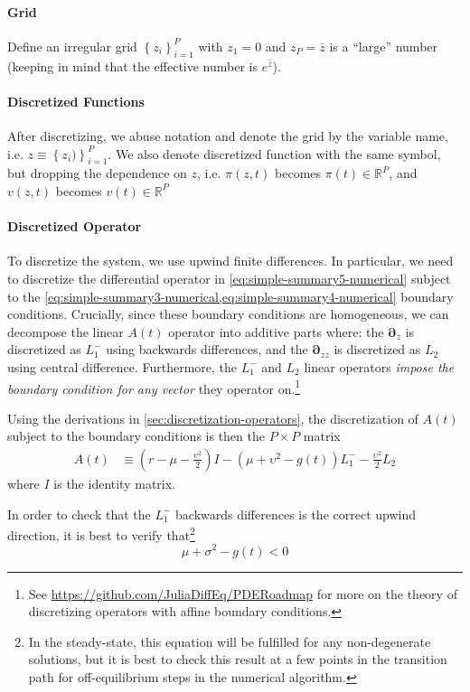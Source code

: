 \documentclass[11pt]{article}
\newcommand{\D}[1][]{\ensuremath{\boldsymbol{\partial}_{#1}}}
\newcommand{\R}{\ensuremath{\mathbb{R}}}
\newcommand{\set}[1]{\ensuremath{\left\{{#1}\right\}}}
\begin{document}
\paragraph{Grid}

Define an irregular grid $\set{z_i}_{i=1}^P$ with $z_1 = 0$ and $z_P = \bar{z}$ is a ``large'' number (keeping in mind that the effective number is $e^{\bar{z}}$). 

\paragraph{Discretized Functions}

After discretizing, we abuse notation and denote the grid by the variable name, i.e. $z \equiv \set{z_i)}_{i=1}^P$.  We also denote discretized function with the same symbol, but dropping the dependence on $z$, i.e. $\pi(z,t)$ becomes $\pi(t) \in \R^P$, and $v(z,t)$ becomes $v(t) \in \R^P$

\paragraph{Discretized Operator}

To discretize the system, we use upwind finite differences.  In particular, we need to discretize the differential operator in \cref{eq:simple-summary5-numerical} subject to the \cref{eq:simple-summary3-numerical,eq:simple-summary4-numerical} boundary conditions.  Crucially, since these boundary conditions are homogeneous, we can decompose the linear $A(t)$ operator into additive parts where: the $\D[z]$ is discretized as $L^{-}_1$ using backwards differences, and the $\D[zz]$ is discretized as $L_2$ using central difference.   Furthermore, the $L^{-}_1$ and $L_2$ linear operators \textit{impose the boundary condition for any vector} they operator on.\footnote{See \url{https://github.com/JuliaDiffEq/PDERoadmap} for more on the theory of discretizing operators with affine boundary conditions.}

Using the derivations in \cref{sec:discretization-operators}, the discretization of $A(t)$ subject to the boundary conditions is then the $P \times P$ matrix
\begin{align}
A(t) &\equiv \left(r - \mu - \frac{\upsilon^2}{2}\right) I - (\mu + \upsilon^2 - g(t)) L^{-}_1 - \frac{\upsilon^2}{2} L_2 \label{eq:A-def-simple}
\end{align}
where $I$ is the identity matrix.

In order to check that the  $L^{-}_1$ backwards differences is the correct upwind direction, it is best to verify that\footnote{In the steady-state, this equation will be fulfilled for any non-degenerate solutions, but it is best to check this result at a few points in the transition path for off-equilibrium steps in the numerical algorithm.}
\begin{equation}
\mu + \sigma^2 - g(t) < 0
\end{equation}
\end{document}
